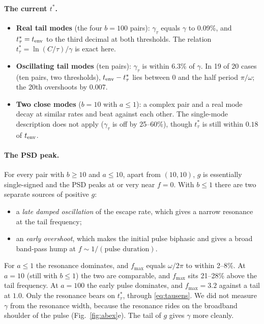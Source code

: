 \documentclass[11pt]{article}
\newcommand{\ttau}{t^*_{\tau}}
\begin{document}
\paragraph{The current $t^*$.}
\begin{itemize}
\item \textbf{Real tail modes} (the four $b=100$ pairs): $\gamma_\tau$ equals
  $\gamma$ to 0.09\%, and $\ttau=t_{\rm env}$ to the third decimal at both
  thresholds. The relation $\ttau=\ln(C/\tau)/\gamma$ is exact here.
\item \textbf{Oscillating tail modes} (ten pairs): $\gamma_\tau$ is within 6.3\%
  of $\gamma$. In 19 of 20 cases (ten pairs, two thresholds),
  $t_{\rm env}-\ttau$ lies between 0 and the half period $\pi/\omega$; the 20th
  overshoots by 0.007.
\item \textbf{Two close modes} ($b=10$ with $a\le1$): a complex pair and a real
  mode decay at similar rates and beat against each other. The single-mode
  description does not apply ($\gamma_\tau$ is off by 25--60\%), though $\ttau$
  is still within $0.18$ of $t_{\rm env}$.
\end{itemize}

\paragraph{The PSD peak.}
For every pair with $b\ge10$ and $a\le10$, apart from $(10,10)$, $g$ is
essentially single-signed and the PSD peaks at or very near $f=0$. With $b\le1$
there are two separate sources of positive $g$:
\begin{itemize}
\item a \emph{late damped oscillation} of the escape rate, which gives a narrow
  resonance at the tail frequency;
\item an \emph{early overshoot}, which makes the initial pulse biphasic and gives
  a broad band-pass hump at $f\sim1/(\text{pulse duration})$.
\end{itemize}
For $a\le1$ the resonance dominates, and $f_{\max}$ equals $\omega/2\pi$ to within
2--8\%. At $a=10$ (still with $b\le1$) the two are comparable, and $f_{\max}$ sits 21--28\% above the
tail frequency. At $a=100$ the early pulse dominates, and $f_{\max}=3.2$ against a
tail at $1.0$. Only the resonance bears on $\ttau$, through
\eqref{eq:tausens}. We did not measure $\gamma$ from the resonance width, because
the resonance rides on the broadband shoulder of the pulse (Fig.~\ref{fig:abex}e).
The tail of $g$ gives $\gamma$ more cleanly.
\end{document}

